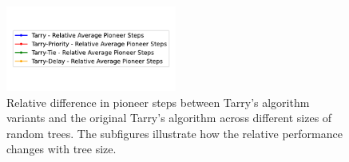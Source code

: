\begin{figure}[H]
    \centering
    \qquad
    \qquad
    \includegraphics[width=0.5\textwidth]{Cap3/tarry_var_steps_legend_relative.pdf}
    \newline
    \qquad 
    \newline
    \qquad 
    \caption{Relative difference in pioneer steps between Tarry's algorithm variants and the original Tarry's algorithm across different sizes of random trees. The subfigures illustrate how the relative performance changes with tree size.} 
    \label{fig_tarry_steps_relative_all_sizes_tree}
\end{figure}

